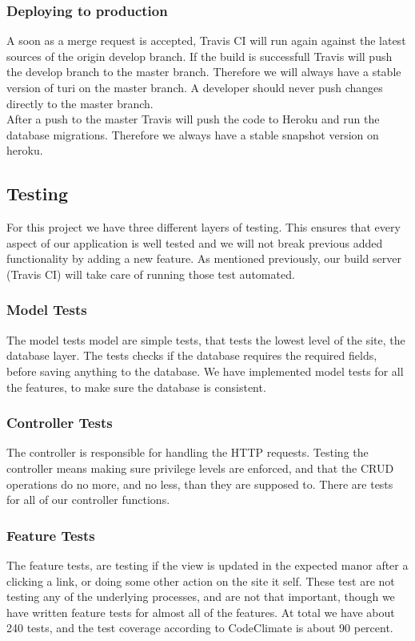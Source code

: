 \documentclass[a4paper]{article}
\begin{document}
\subsubsection{Deploying to production}
A soon as a merge request is accepted, Travis CI will run again against the latest sources of the origin develop branch. If the build is successfull Travis will push the develop branch to the master branch. Therefore we will always have a stable version of turi on the master branch. A developer should never push changes directly to the master branch.\\

\noindent
After a push to the master Travis will push the code to Heroku and run the database migrations. Therefore we always have a stable snapshot version on heroku.

\subsection{Testing}

For this project we have three different layers of testing. This ensures that every aspect of our application is well tested and we will not break previous added functionality by adding a new feature. As mentioned previously, our build server (Travis CI) will take care of running those test automated.

\subsubsection{Model Tests}
The model tests model are simple tests, that tests the lowest level of the site, the database layer. The tests checks if the database requires the required fields, before saving anything to the database. We have implemented model tests for all the features, to make sure the database is consistent.
\\

\subsubsection{Controller Tests}
The controller is responsible for handling the HTTP requests. Testing the controller means making sure privilege levels are enforced, and that the CRUD operations do no more, and no less, than they are supposed to. There are tests for all of our controller functions.
\\

\subsubsection{Feature Tests}
The feature tests, are testing if the view is updated in the expected manor after a clicking a link, or doing some other action on the site it self. These test are not testing any of the underlying processes, and are not that important, though we have written feature tests for almost all of the features. 
At total we have about 240 tests, and the test coverage according to CodeClimate is about 90 percent. \\
\end{document}
